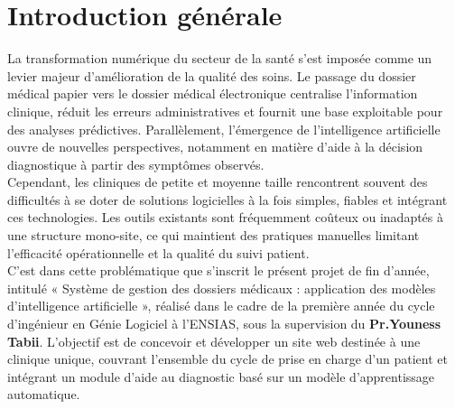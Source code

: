 \documentclass[12pt,a4paper]{report}
\begin{document}
\clearpage
\tableofcontents
\clearpage

\listoffigures
{}
\clearpage

\listoftables
{}
\clearpage

\chapter*{Introduction générale}
\thispagestyle{fancy}

La transformation numérique du secteur de la santé s'est imposée comme un levier majeur d'amélioration de la qualité des soins. Le passage du dossier médical papier vers le dossier médical électronique centralise l'information clinique, réduit les erreurs administratives et fournit une base exploitable pour des analyses prédictives. Parallèlement, l'émergence de l'intelligence artificielle ouvre de nouvelles perspectives, notamment en matière d'aide à la décision diagnostique à partir des symptômes observés.\\

Cependant, les cliniques de petite et moyenne taille rencontrent souvent des difficultés à se doter de solutions logicielles à la fois simples, fiables et intégrant ces technologies. Les outils existants sont fréquemment coûteux ou inadaptés à une structure mono-site, ce qui maintient des pratiques manuelles limitant l'efficacité opérationnelle et la qualité du suivi patient.\\

C'est dans cette problématique que s'inscrit le présent projet de fin d'année, intitulé « Système de gestion des dossiers médicaux : application des modèles d'intelligence artificielle », réalisé dans le cadre de la première année du cycle d'ingénieur en Génie Logiciel à l'ENSIAS, sous la supervision du \textbf{Pr.Youness Tabii}. L'objectif est de concevoir et développer un site web destinée à une clinique unique, couvrant l'ensemble du cycle de prise en charge d'un patient et intégrant un module d'aide au diagnostic basé sur un modèle d'apprentissage automatique.\\
\end{document}
